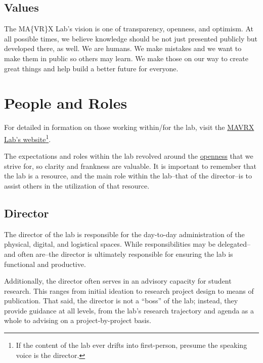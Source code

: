 \documentclass[]{tufte-book}
\begin{document}
\hypertarget{values}{%
\section*{Values}\label{values}}

The MA\{VR\}X Lab's vision is one of transparency, openness, and optimism. At all possible times, we believe knowledge should be not just presented publicly but developed there, as well. We are humans. We make mistakes and we want to make them in public so others may learn. We make those on our way to create great things and help build a better future for everyone.

\hypertarget{people}{%
\chapter{People and Roles}\label{people}}

For detailed in formation on those working within/for the lab, visit the \href{https://mavrxlab.org/people}{MAVRX Lab's website}\footnote{If the content of the lab ever drifts into first-person, presume the speaking voice is the director.}.

The expectations and roles within the lab revolved around the \protect\hyperlink{openness}{openness} that we strive for, so clarity and frankness are valuable. It is important to remember that the lab is a resource, and the main role within the lab--that of the director--is to assist others in the utilization of that resource.

\hypertarget{director}{%
\section{Director}\label{director}}

The director of the lab is responsible for the day-to-day administration of the physical, digital, and logistical spaces. While responsibilities may be delegated--and often are--the director is ultimately responsible for ensuring the lab is functional and productive.

Additionally, the director often serves in an advisory capacity for student research. This ranges from initial ideation to research project design to means of publication. That said, the director is not a ``boss'' of the lab; instead, they provide guidance at all levels, from the lab's research trajectory and agenda as a whole to advising on a project-by-project basis.
\end{document}
